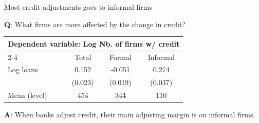 \documentclass[aspectratio=169]{beamer}
\begin{document}
\begin{frame}{Most credit adjustments goes to informal firms}

\large \textbf{Q}: What firms are more affected by the change in credit?

\vspace{5mm}

\begin{center}
    \begin{tabular}{lccc}
    \toprule
    \multicolumn{4}{c}{\textbf{Dependent variable}: Log Nb. of firms w/ credit} \\
    \cmidrule(lr){2-4}
              & Total & Formal & Informal \\
    \midrule
    Log loans &  0.152  & -0.051  & 0.274 \\
              & (0.023) & (0.019) & (0.037) \\
    \midrule
    Mean (level) & 454 & 344 & 110 \\
    \bottomrule
    \end{tabular}
\end{center}

\vspace{5mm}

\begin{center}
    \large \textbf{A}: When banks adjust credit, their main adjusting margin is on informal firms.
\end{center}

\end{frame}

\end{document}
